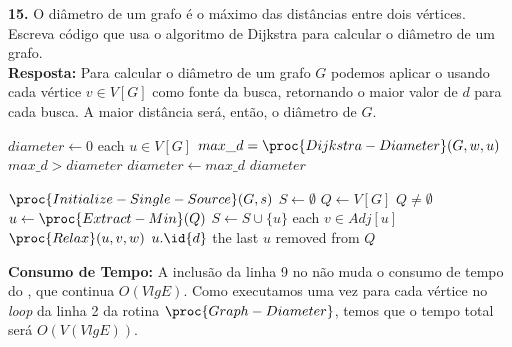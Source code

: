 
\indent\textbf{15.} O diâmetro de um grafo é o máximo das distâncias entre dois vértices. Escreva código que usa o algoritmo de Dijkstra para calcular o diâmetro de um grafo.\\[6pt]
\textbf{Resposta:} Para calcular o diâmetro de um grafo $G$ podemos aplicar o  usando cada vértice $v \in V[G]$ como fonte da busca, retornando o maior valor de $d$ para cada busca. A maior distância será, então, o diâmetro de $G$.

\begin{codebox}
\li $diameter \gets 0$
\li \For each $u \in V[G]$
\li \Do
        $max\_d = \proc{Dijkstra-Diameter}(G, w, u)$
\li     \If $max\_d > diameter$
\li     \Then 
            $diameter \gets max\_d$
        \End
    \End
\li \Return $diameter$
\end{codebox}

\begin{codebox}
\li $\proc{Initialize-Single-Source}(G, s)$
\li $S \gets \emptyset$
\li $Q \gets V[G]$
\li \While $Q \neq \emptyset$
\li \Do
        $u \gets \proc{Extract-Min}(Q)$
\li     $S \gets S \cup \{u\}$
\li     \For each $v \in Adj[u]$
\li     \Do
            $\proc{Relax}(u, v, w)$
        \End
    \End
\li \Return $u.\id{d}$ \Comment the last $u$ removed from $Q$
\end{codebox}

\textbf{Consumo de Tempo:} A inclusão da linha 9 no  não muda o consumo de tempo do , que continua $O(V lg E)$. Como executamos uma vez para cada vértice no \textit{loop} da linha 2 da rotina $\proc{Graph-Diameter}$, temos que o tempo total será $O(V(V lg E))$.\\[6pt]